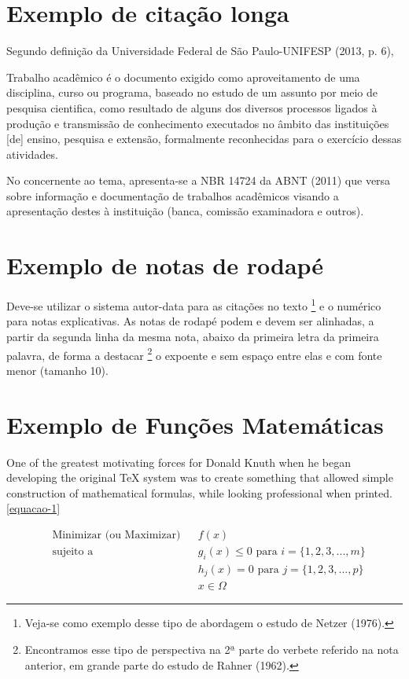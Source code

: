 \lipsum[3]

\section{Exemplo de citação longa}

Segundo definição da Universidade Federal de São Paulo-UNIFESP (2013, p. 6),

\begin{citacao}
Trabalho acadêmico é o documento exigido como aproveitamento de uma disciplina, curso ou programa, baseado no estudo de um assunto por meio de pesquisa cientifica, como resultado de alguns dos diversos processos ligados à produção e transmissão de conhecimento executados no âmbito das instituições [de] ensino, pesquisa e extensão, formalmente reconhecidas para o exercício dessas atividades.
\end{citacao}

No concernente ao tema, apresenta-se a NBR 14724 da ABNT (2011) que versa sobre informação e documentação de trabalhos acadêmicos visando a apresentação destes à instituição (banca, comissão examinadora e outros).

\section{Exemplo de notas de rodapé}

Deve-se utilizar o sistema autor-data para as citações no texto \footnote{Veja-se como exemplo desse tipo de abordagem o estudo de Netzer (1976).} e o numérico para notas explicativas. As notas de rodapé podem e devem ser alinhadas, a partir da segunda linha da mesma nota, abaixo da primeira letra da primeira palavra, de forma a destacar \footnote{Encontramos esse tipo de perspectiva na 2ª parte do verbete referido na nota anterior, em grande parte do estudo de Rahner (1962).} o expoente e sem espaço entre elas e com fonte menor (tamanho 10).


\section{Exemplo de Funções Matemáticas}

One of the greatest motivating forces for Donald Knuth when he began developing the original TeX system was to create something that allowed simple construction of mathematical formulas, while looking professional when printed. \autoref{equacao-1}

\begin{equation}
	\label{equacao-1}
	\begin{aligned}
		& \text{Minimizar (ou Maximizar)}
		& & f(x) \\
		& \text{sujeito a}
		& & g_i(x) \leq 0 \text{ para } i=\{1,2,3,...,m\} \\
		&&& h_j(x) = 0 \text{ para } j=\{1,2,3,...,p\} \\
		&&& x \in \Omega
	\end{aligned}
\end{equation}

